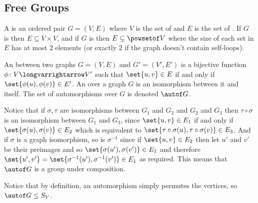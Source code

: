 \documentclass[10pt]{article}
\begin{document}


\bigskip

\subsection{Free Groups}

\begin{defn*}

    A  is an ordered pair $G=(V,E)$ where $V$ is the set of  and $E$ is the set of .
    If $G$ is  then $E\subseteq V\times V$, and if $G$ is  then $E\subseteq\powsetof V$ where the size of each set in $E$ has at most $2$ elements (or exactly $2$ if the
    graph doesn't contain self-loops).

\end{defn*}

\begin{defn*}

    An  between two graphs $G=(V,E)$ and $G'=(V',E')$ is a bijective function $\phi\colon V\longvarrightarrow V'$ such that $\set{u,v}\in E$ if and only if $\set{\phi(u),\phi(v)}\in E'$.
    An  over a graph $G$ is an isomorphism between it and itself.
    The set of automorphisms over $G$ is denoted $\autof G$.

\end{defn*}

Notice that if $\sigma,\tau$ are isomorphisms between $G_1$ and $G_2$ and $G_2$ and $G_3$ then $\tau\circ\sigma$ is an isomorphism between $G_1$ and $G_3$, since $\set{u,v}\in E_1$ if and only if
$\set{\sigma(u),\sigma(v)}\in E_2$ which is equivalent to $\set{\tau\circ\sigma(u),\tau\circ\sigma(v)}\in E_3$.
And if $\sigma$ is a graph isomorphism, so is $\sigma^{-1}$ since if $\set{u,v}\in E_2$ then let $u'$ and $v'$ be their preimages and so $\set{\sigma(u'),\sigma(v')}\in E_1$ and therefore
$\set{u',v'}=\set{\sigma^{-1}(u'),\sigma^{-1}(v')}\in E_1$ as required.
This means that $\autof G$ is a group under composition.

Notice that by definition, an automorphism simply permutes the vertices, so $\autof G\leq S_V$.
\end{document}
